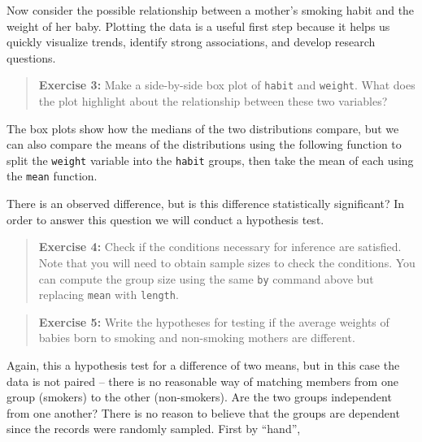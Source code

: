 \documentclass[]{book}
\newenvironment{Shaded}{\begin{snugshade}}{\end{snugshade}}
\newcommand{\KeywordTok}[1]{\textcolor[rgb]{0.13,0.29,0.53}{\textbf{#1}}}
\newcommand{\OperatorTok}[1]{\textcolor[rgb]{0.81,0.36,0.00}{\textbf{#1}}}
\newcommand{\NormalTok}[1]{#1}
\theoremstyle{definition}
\theoremstyle{definition}
\theoremstyle{definition}
\theoremstyle{remark}
\begin{document}
Now consider the possible relationship between a mother's smoking habit
and the weight of her baby. Plotting the data is a useful first step
because it helps us quickly visualize trends, identify strong
associations, and develop research questions.

\begin{quote}
\textbf{Exercise 3:} Make a side-by-side box plot of \texttt{habit} and
\texttt{weight}. What does the plot highlight about the relationship
between these two variables?
\end{quote}

The box plots show how the medians of the two distributions compare, but
we can also compare the means of the distributions using the following
function to split the \texttt{weight} variable into the \texttt{habit}
groups, then take the mean of each using the \texttt{mean} function.

\begin{Shaded}
\end{Shaded}

There is an observed difference, but is this difference statistically
significant? In order to answer this question we will conduct a
hypothesis test.

\begin{quote}
\textbf{Exercise 4:} Check if the conditions necessary for inference are
satisfied. Note that you will need to obtain sample sizes to check the
conditions. You can compute the group size using the same \texttt{by}
command above but replacing \texttt{mean} with \texttt{length}.
\end{quote}

\begin{quote}
\textbf{Exercise 5:} Write the hypotheses for testing if the average
weights of babies born to smoking and non-smoking mothers are different.
\end{quote}

Again, this a hypothesis test for a difference of two means, but in this
case the data is not paired -- there is no reasonable way of matching
members from one group (smokers) to the other (non-smokers). Are the two
groups independent from one another? There is no reason to believe that
the groups are dependent since the records were randomly sampled. First
by ``hand'',
\end{document}
